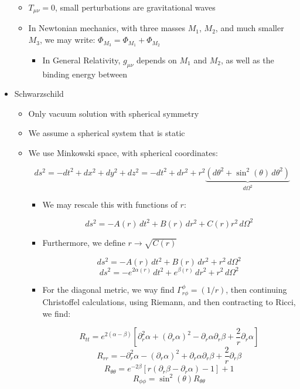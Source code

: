 \begin{itemize}
\begin{itemize}
      \item $T_{\mu\nu}=0$, small perturbations are gravitational waves

      \item In Newtonian mechanics, with three masses $M_1$, $M_2$, and much smaller $M_3$, we may write: $\Phi_{M_3}=\Phi_{M_1}+\Phi_{M_2}$

        \begin{itemize}

          \item In General Relativity, $g_{\mu\nu}$ depends on $M_1$ and $M_2$, as well as the binding energy between

        \end{itemize}

    \end{itemize}

  \item Schwarzschild

    \begin{itemize}
        
      \item Only vacuum solution with spherical symmetry

      \item We assume a spherical system that is static

      \item We use Minkowski space, with spherical coordinates:

        $$ds^2=-dt^2+dx^2+dy^2+dz^2=-dt^2+dr^2+r^2\underbrace{(d\theta^2+\sin^2(\theta)\,d\theta^2)}_{d\Omega^2}$$

        \begin{itemize}

          \item We may rescale this with functions of $r$:

            $$ds^2=-A(r)\,dt^2+B(r)\,dr^2+C(r)r^2\,d\Omega^2$$

          \item Furthermore, we define $r\to\sqrt{C(r)}$

            $$ds^2=-A(r)\,dt^2+B(r)\,dr^2+r^2\,d\Omega^2$$
            $$ds^2=-e^{2\alpha(r)}\,dt^2+e^{\beta(r)}\,dr^2+r^2\,d\Omega^2$$

          \item For the diagonal metric, we way find $\Gamma^{\phi}_{r\phi}=(1/r)$, then continuing Christoffel calculations, using Riemann, and then contracting to Ricci, we find:

            $$R_{tt}=e^{2(\alpha-\beta)}\left[ \partial_r^{2}\alpha+(\partial_r\alpha)^2-\partial_r\alpha\partial_r\beta+\frac{2}{r}\partial_r\alpha \right]$$
            $$R_{rr}=-\partial^2_r\alpha-(\partial_r\alpha)^2+\partial_r\alpha\partial_r\beta+\frac{2}{r}\partial_r\beta$$
            $$R_{\theta\theta}=e^{-2\beta}\left[ r(\partial_r\beta-\partial_r\alpha)-1 \right]+1$$
            $$R_{\phi\phi}=\sin^2(\theta)R_{\theta\theta}$$


\end{itemize}
\end{itemize}
\end{itemize}
